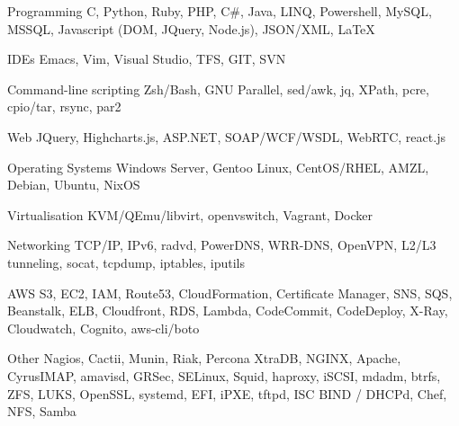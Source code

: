 
\begin{cvskills}

\cvskill
{Programming} 
{C, Python, Ruby, PHP, C\#, Java, LINQ, Powershell, MySQL, MSSQL, Javascript (DOM, JQuery, Node.js), JSON/XML, LaTeX}

\cvskill
{IDEs}
{Emacs, Vim, Visual Studio, TFS, GIT, SVN}

\cvskill
{Command-line scripting}
{Zsh/Bash, GNU Parallel, sed/awk, jq, XPath, pcre, cpio/tar, rsync, par2}

\cvskill
{Web} 
{JQuery, Highcharts.js, ASP.NET, SOAP/WCF/WSDL, WebRTC, react.js}

\cvskill
{Operating Systems} 
{Windows Server, Gentoo Linux, CentOS/RHEL, AMZL, Debian, Ubuntu, NixOS}

\cvskill
{Virtualisation}
{KVM/QEmu/libvirt, openvswitch, Vagrant, Docker} 

\cvskill
{Networking} 
{TCP/IP, IPv6, radvd, PowerDNS, WRR-DNS, OpenVPN, L2/L3 tunneling, socat, tcpdump, iptables, iputils} 

\cvskill
{AWS}
{S3, EC2, IAM, Route53, CloudFormation, Certificate Manager, SNS, SQS, Beanstalk, ELB, Cloudfront, RDS, Lambda, CodeCommit, CodeDeploy, X-Ray, Cloudwatch, Cognito, aws-cli/boto}

\cvskill
{Other}
{Nagios, Cactii, Munin, Riak, Percona XtraDB, NGINX, Apache, CyrusIMAP, amavisd, GRSec, SELinux, Squid, haproxy, iSCSI, mdadm, btrfs, ZFS, LUKS, OpenSSL, systemd, EFI, iPXE, tftpd, ISC BIND / DHCPd, Chef, NFS, Samba}
\end{cvskills}

